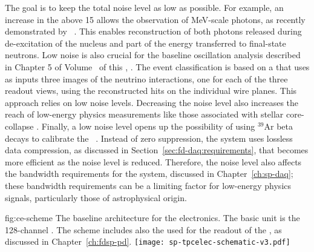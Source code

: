 The goal is to keep the total noise level as low as possible. For example, an 
increase in the  above 15 allows the observation of MeV-scale photons, 
as recently demonstrated by ~\cite{Acciarri:2018myr}. This enables  
reconstruction of both photons released during de-excitation of the nucleus and 
part of the energy transferred to final-state neutrons. Low noise is also crucial
for the baseline oscillation analysis described in Chapter 5 of Volume~\volnumberphysics{} 
of this , \voltitlephysics{}. The event classification is based
on a  that uses as inputs three images of the neutrino interactions, 
one for each of the three readout views, using the reconstructed hits on the 
individual wire planes. This approach relies on low noise levels. Decreasing 
the noise level also increases the reach of low-energy physics measurements 
like those associated with stellar core-collapse . 
Finally, a low noise level opens up the possibility of using $\mathrm{{}^{39}Ar}$ 
beta decays to calibrate the  ~\cite{MICROBOONE-NOTE-1050-PUB}.
Instead of zero suppression, the   system uses lossless 
data compression, as discussed in Section~\ref{sec:fd-daq:requirements}, that
becomes more efficient as the noise level is reduced. Therefore, the noise level 
also affects the bandwidth requirements for the  system,
discussed in Chapter~\ref{ch:sp-daq};
these bandwidth requirements can be a limiting factor for low-energy
physics signals, particularly those of astrophysical origin.

\begin{dunefigure}
{fig:ce-scheme}
{The baseline architecture for the  electronics. The basic unit is the
128-channel . The scheme includes also the  used for the 
readout of the , as discussed in Chapter~\ref{ch:fdsp-pd}.}
\texttt{[image: sp-tpcelec-schematic-v3.pdf]}
\end{dunefigure}

